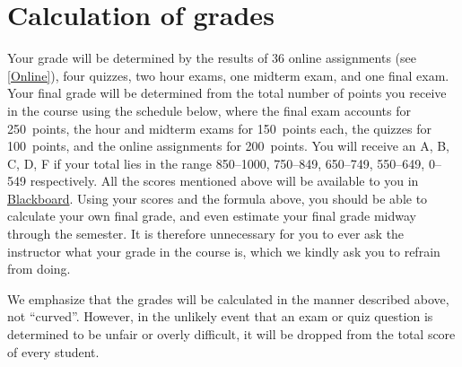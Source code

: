 \documentclass[11pt]{article}
\begin{document}
\section{Calculation of grades}\label{Assessment}
Your grade will be determined by the results of 
36 online assignments (see \autoref{Online}),
four quizzes, two hour exams, one midterm exam, and one 
final exam.
Your final grade will be determined from the total
number of points you receive in the course using the schedule below,
where the final exam accounts for 250~points,
the hour and midterm exams for 150~points each,
the quizzes for 100~points,
and the online assignments for 200~points.
You will receive an A, B, C, D, F if your total lies in the range
850--1000, 750--849, 650--749, 550--649, 0--549 respectively.
All the scores mentioned above will be available to you in
\href{https://bb.its.iastate.edu}{Blackboard}. Using your scores
and the formula above, you should be able to calculate your own final grade,
and even estimate your final grade midway through the semester.
It is therefore unnecessary for you to ever ask the instructor
what your grade in the course is, which we kindly ask you to refrain from
doing.

We emphasize that the grades will be calculated in the manner described
above, not ``curved''.
However, in the unlikely event that an exam or quiz question is determined
to be unfair or overly difficult, it will be dropped from the total score of
every student.
\end{document}
